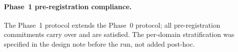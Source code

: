 \paragraph{Phase~1 pre-registration compliance.} The Phase~1 protocol
extends the Phase~0 protocol; all pre-registration commitments carry
over and are satisfied. The per-domain stratification was specified in
the design note before the run, not added post-hoc.
